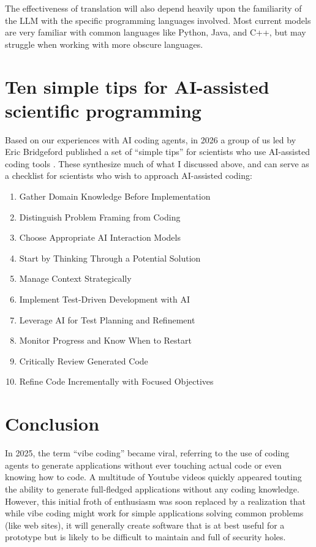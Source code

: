 The effectiveness of translation will also depend heavily upon the familiarity of the LLM with the specific programming languages involved. Most current models are very familiar with common languages like Python, Java, and C++, but may struggle when working with more obscure languages.

\section{Ten simple tips for AI-assisted scientific programming}

Based on our experiences with AI coding agents, in 2026 a group of us led by Eric Bridgeford published a set of ``simple tips'' for scientists who use AI-assisted coding tools \citep{Bridgeford:2025aa}. These synthesize much of what I discussed above, and can serve as a checklist for scientists who wish to approach AI-assisted coding:

\begin{enumerate}
\item Gather Domain Knowledge Before Implementation
\item Distinguish Problem Framing from Coding
\item Choose Appropriate AI Interaction Models
\item Start by Thinking Through a Potential Solution
\item Manage Context Strategically
\item Implement Test-Driven Development with AI
\item Leverage AI for Test Planning and Refinement
\item Monitor Progress and Know When to Restart
\item Critically Review Generated Code
\item Refine Code Incrementally with Focused Objectives
\end{enumerate}

\section{Conclusion}

In 2025, the term ``vibe coding'' became viral, referring to the use of coding agents to generate applications without ever touching actual code or even knowing how to code.
A multitude of Youtube videos quickly appeared touting the ability to generate full-fledged applications without any coding knowledge.
However, this initial froth of enthusiasm was soon replaced by a realization that while vibe coding might work for simple applications solving common problems (like web sites), it will generally create software that is at best useful for a prototype but is likely to be difficult to maintain and full of security holes.

